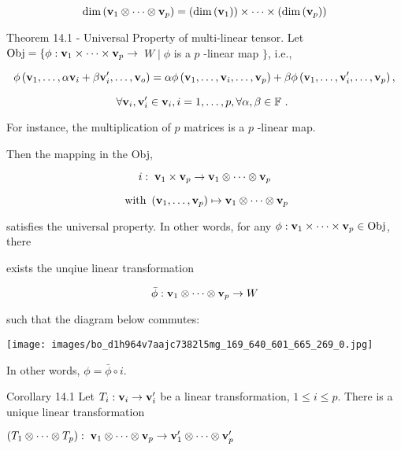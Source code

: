\documentclass[11pt]{article}
\begin{document}
\[
\dim \left( {{\bf v}_1 \otimes  \cdots  \otimes  {\bf v}_{p}}\right)  = \left( {\dim \left( {\bf v}_1\right) }\right)  \times  \cdots  \times  \left( {\dim \left( {\bf v}_{p}\right) }\right)
\]

Theorem 14.1 - Universal Property of multi-linear tensor. Let \(\mathrm{{Obj}} = \left\{  {\phi  : {\bf v}_1 \times  \cdots  \times  {\bf v}_{p} \rightarrow  }\right.\)  \(W \mid  \phi\) is a \(p\) -linear map \(\}\), i.e.,

\[
\phi \left( {{\bf v}_1,\ldots ,\alpha {\bf v}_{i} + \beta {\bf v}_{i}^{\prime },\ldots ,{\bf v}_{o}}\right)  = {\alpha \phi }\left( {{\bf v}_1,\ldots ,{\bf v}_{i},\ldots ,{\bf v}_{p}}\right)  + {\beta \phi }\left( {{\bf v}_1,\ldots ,{\bf v}_{i}^{\prime },\ldots ,{\bf v}_{p}}\right) ,
\]

\[
\forall {\bf v}_{i},{\bf v}_{i}^{\prime } \in  {\bf v}_{i},i = 1,\ldots ,p,\forall \alpha ,\beta  \in  \mathbb{F}\text{ . }
\]

For instance, the multiplication of \(p\) matrices is a \(p\) -linear map.

Then the mapping in the Obj,

\[
i : \;{\bf v}_1 \times  {\bf v}_{p} \rightarrow  {\bf v}_1 \otimes  \cdots  \otimes  {\bf v}_{p}
\]

\[
\text{ with }\left( {{\bf v}_1,\ldots ,{\bf v}_{p}}\right)  \mapsto  {\bf v}_1 \otimes  \cdots  \otimes  {\bf v}_{p}
\]

satisfies the universal property. In other words, for any \(\phi  : {\bf v}_1 \times  \cdots  \times  {\bf v}_{p} \in  \mathrm{{Obj}}\), there

exists the unqiue linear transformation

\[
\bar{\phi } : {\bf v}_1 \otimes  \cdots  \otimes  {\bf v}_{p} \rightarrow  W
\]

such that the diagram below commutes:

\begin{center}
\texttt{[image: images/bo\_d1h964v7aajc7382l5mg\_169\_640\_601\_665\_269\_0.jpg]}
\end{center}
\hspace*{3em} 

In other words, \(\phi  = \bar{\phi } \circ  i\).

Corollary 14.1 Let \({T}_{i} : {\bf v}_{i} \rightarrow  {\bf v}_{i}^{\prime }\) be a linear transformation, \(1 \leq  i \leq  p\). There is a unique linear transformation

\(\left( {{T}_1 \otimes  \cdots  \otimes  {T}_{p}}\right)  : \;{\bf v}_1 \otimes  \cdots  \otimes  {\bf v}_{p} \rightarrow  {\bf v}_1^{\prime } \otimes  \cdots  \otimes  {\bf v}_{p}^{\prime }\)
\end{document}
